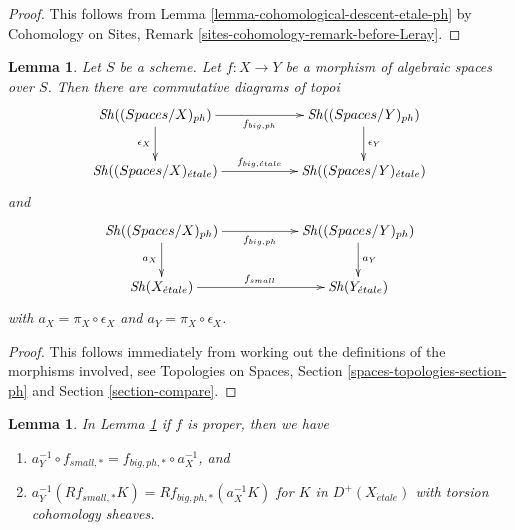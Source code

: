 \documentclass{stacks-project}
\theoremstyle{plain}
\newtheorem{lemma}[subsection]{Lemma}
\theoremstyle{definition}
\theoremstyle{remark}
\numberwithin{equation}{subsection}
\def\Sh{\mathop{\mathit{Sh}}\nolimits}
\def\etale{{\acute{e}tale}}
\begin{document}
\begin{proof}
This follows from Lemma \ref{lemma-cohomological-descent-etale-ph}
by Cohomology on Sites, Remark \ref{sites-cohomology-remark-before-Leray}.
\end{proof}

\begin{lemma}
\label{lemma-push-pull-ph-etale}
Let $S$ be a scheme.
Let $f : X \to Y$ be a morphism of algebraic spaces over $S$.
Then there are commutative diagrams of topoi
$$
\xymatrix{
\Sh((\textit{Spaces}/X)_{ph}) \ar[rr]_{f_{big, ph}} \ar[d]_{\epsilon_X} & &
\Sh((\textit{Spaces}/Y)_{ph}) \ar[d]^{\epsilon_Y} \\
\Sh((\textit{Spaces}/X)_\etale) \ar[rr]^{f_{big, \etale}} & &
\Sh((\textit{Spaces}/Y)_\etale)
}
$$
and
$$
\xymatrix{
\Sh((\textit{Spaces}/X)_{ph}) \ar[rr]_{f_{big, ph}} \ar[d]_{a_X} & &
\Sh((\textit{Spaces}/Y)_{ph}) \ar[d]^{a_Y} \\
\Sh(X_\etale) \ar[rr]^{f_{small}} & &
\Sh(Y_\etale)
}
$$
with $a_X = \pi_X \circ \epsilon_X$ and $a_Y = \pi_X \circ \epsilon_X$.
\end{lemma}

\begin{proof}
This follows immediately from working out the definitions of the
morphisms involved, see
Topologies on Spaces, Section \ref{spaces-topologies-section-ph}
and Section \ref{section-compare}.
\end{proof}

\begin{lemma}
\label{lemma-proper-push-pull-ph-etale}
In Lemma \ref{lemma-push-pull-ph-etale} if $f$ is proper, then we have
\begin{enumerate}
\item $a_Y^{-1} \circ f_{small, *} = f_{big, ph, *} \circ a_X^{-1}$, and
\item
$a_Y^{-1}(Rf_{small, *}K) = Rf_{big, ph, *}(a_X^{-1}K)$
for $K$ in $D^+(X_\etale)$ with torsion cohomology sheaves.
\end{enumerate}
\end{lemma}
\end{document}
